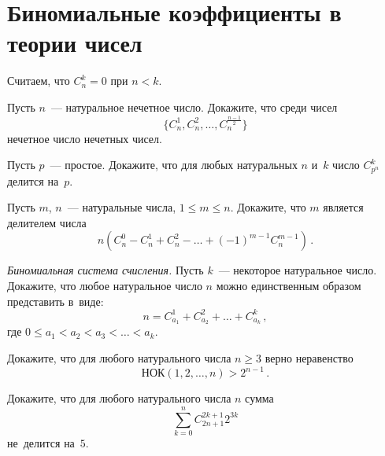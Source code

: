 
\section*{Биномиальные коэффициенты в теории чисел}


Считаем, что $C_n^k = 0$ при $n<k$.

\begin{problems}

\item
Пусть $n$~--- натуральное нечетное число.
Докажите, что среди чисел\[
    \{ C_n^1, C_n^2, \ldots, C_n^{\frac{n-1}{2}} \}
\]
нечетное число нечетных чисел.

\item
Пусть $p$~--- простое.
Докажите, что для любых натуральных $n$ и~$k$ число $C_{p^n}^k$ делится на~$p$.

\item
Пусть $m$, $n$~--- натуральные числа, $1 \leq m \leq n$.
Докажите, что $m$ является делителем числа
\[
    n (C_n^0 - C_n^1 + C_n^2 - \ldots + (-1)^{m-1}C_n^{m-1})
\,.\]

\item\emph{Биномиальная система счисления.}
Пусть $k$~--- некоторое натуральное число.
Докажите, что любое натуральное число $n$ можно единственным образом
представить в~виде:
\[
    n = C_{a_1}^1 + C_{a_2}^2 + \ldots + C_{a_k}^k
\,,\]
где $0 \leq a_1 < a_2 < a_3 < \ldots < a_k$.

\item
Докажите, что для любого натурального числа $n \geq 3$ верно неравенство
\[
    \text{НОК}(1, 2, \ldots, n) > 2^{n-1}
\,.\]

\item
Докажите, что для любого натурального числа $n$ сумма
\[
    \sum\limits_{k=0}^n
        C_{2n+1}^{2k+1} 2^{3k}
\]
не~делится на~$5$.

\end{problems}

